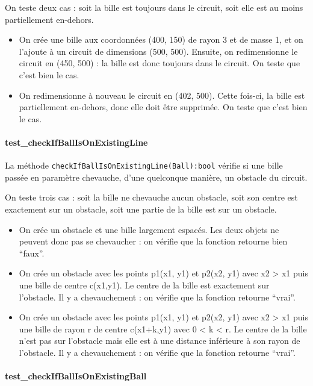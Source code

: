 \documentclass{report}
\begin{document}
On teste deux cas : soit la bille est toujours dans le circuit, soit elle est au moins partiellement en-dehors.

\begin{itemize}
\item On crée une bille aux coordonnées (400, 150) de rayon 3 et de masse 1, et on l’ajoute à un circuit de dimensions (500, 500). Ensuite, on redimensionne le circuit en (450, 500) : la bille est donc toujours dans le circuit. On teste que c’est bien le cas.
\item On redimensionne à nouveau le circuit en (402, 500). Cette fois-ci, la bille est partiellement en-dehors, donc elle doit être supprimée. On teste que c’est bien le cas.
\end{itemize}

\paragraph{test\_checkIfBallIsOnExistingLine}

La méthode \texttt{checkIfBallIsOnExistingLine(Ball):bool} vérifie si une bille passée en paramètre chevauche, d’une quelconque manière, un obstacle du circuit.

On teste trois cas : soit la bille ne chevauche aucun obstacle, soit son centre est exactement sur un obstacle, soit une partie de la bille est sur un obstacle.

\begin{itemize}
\item On crée un obstacle et une bille largement espacés. Les deux objets ne peuvent donc pas se chevaucher : on vérifie que la fonction retourne bien “faux”.
\item On crée un obstacle avec les points p1(x1, y1) et p2(x2, y1) avec x2 > x1 puis une bille de centre c(x1,y1). Le centre de la bille est exactement sur l’obstacle. Il y a chevauchement : on vérifie que la fonction retourne “vrai”.
\item On crée un obstacle avec les points p1(x1, y1) et p2(x2, y1) avec x2 > x1 puis une bille de rayon r de centre c(x1+k,y1) avec 0 < k < r. Le centre de la bille n’est pas sur l’obstacle mais elle est à une distance inférieure à son rayon de l’obstacle. Il y a chevauchement : on vérifie que la fonction retourne “vrai”.
\end{itemize}

\paragraph{test\_checkIfBallIsOnExistingBall}
\end{document}
